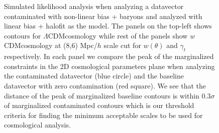 \documentclass[fleqn,usenatbib]{mnras}
\newcommand{\lcdm}{$\Lambda$CDM}
\newcommand{\wcdm}{$w$CDM}
\begin{document}
\begin{figure}
{     }
\hfill
{}
    \caption[]{Simulated likelihood analysis when analyzing a datavector contaminated with non-linear bias + baryons and analyzed with linear bias + halofit as the model. The panels on the top-left shows contours for \lcdm cosmology while rest of the panels show \wcdm cosmology at (8,6) Mpc/$h$ scale cut for $w(\theta)$ and $\gamma_t$ respectively. In each panel we compare the peak of the marginalized constraints in the 2D cosmological parameters plane when analyzing the contaminated datavector (blue circle) and the baseline datavector with zero contamination (red square). We see that the distance of the peak of marginalized baseline contours is within 0.3$\sigma$ of marginalized contaminated contours which is our threshold criteria for finding the minimum acceptable scales to be used for cosmological analysis.}
\end{figure}
\end{document}
